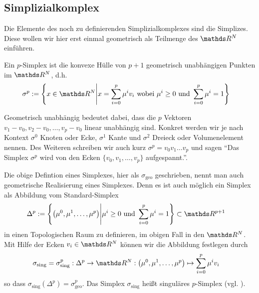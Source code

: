   \subsection{Simplizialkomplex}
    
    Die Elemente des noch zu definierenden Simplizialkomplexes sind die Simplizes.
    Diese wollen wir hier erst einmal geometrisch als Teilmenge des \( \R^{N} \) einführen.

    \begin{definition}
      \label{defSimplex}
      Ein \( p \)-Simplex ist die konvexe Hülle von \( p+1 \) geometrisch unabhängigen Punkten im \( \R^{N} \), d.h.
      \begin{align}
        \sigma^{p} &:= \left\{  x \in \R^{N} \middle| x = \sum_{i=0}^{p}\mu^{i}v_{i} \text{ wobei } \mu^{i} \ge 0  \text{ und } \sum_{i=0}^{p}\mu^{i} = 1 \right\}
      \end{align}
    \end{definition}
    
    Geometrisch unabhängig bedeutet dabei, dass die \( p \) Vektoren \( v_{1} - v_{0}, v_{2} - v_{0},\ldots,  v_{p} - v_{0} \) linear unabhängig sind.
    Konkret werden wir je nach Kontext \( \sigma^{0} \) Knoten oder Ecke, \( \sigma^{1} \) Kante und \( \sigma^{2} \) Dreieck oder Volumenelement nennen.
    Des Weiteren schreiben wir auch kurz \( \sigma^{p} = v_{0} v_{1} \ldots v_{p} \) und sagen 
    "`Das Simplex \( \sigma^{p} \) wird von den Ecken \( \{ v_{0}, v_{1}, \ldots, v_{p}\} \) aufgespannt."'.

    \begin{bemerkung}
      \label{singSimplex}
      Die obige Defintion eines Simplexes, hier als \( \sigma_{\text{geo}} \) geschrieben, nennt man auch geometrische Realisierung eines Simplexes.
      Denn es ist auch möglich ein Simplex als Abbildung vom Standard-Simplex 
        \begin{align} 
          \Delta^{p} &:= \left\{\left( \mu^{0},\mu^{1},\ldots,\mu^{p} \right) \middle| \mu^{i} \ge 0  \text{ und } \sum_{i=0}^{p}\mu^{i} = 1 \right\} \subset
        \R^{p+1} 
        \end{align}
      in einen Topologischen Raum zu definieren, im obigen Fall in den \( \R^{N} \). 
      Mit Hilfe der Ecken \( v_{i}\in\R^{N} \) können wir die Abbildung festlegen durch
      \begin{align}
        \sigma_{\text{sing}} = \sigma^{p}_{\text{sing}} : \Delta^{p} &\rightarrow \R^{N}
                        : \left( \mu^{0},\mu^{1},\ldots,\mu^{p} \right)\mapsto \sum_{i=0}^{p}\mu^{i}v_{i}
      \end{align}
      so dass \( \sigma_{\text{sing}}(\Delta^{p}) = \sigma^{p}_{\text{geo}} \).
      Das Simplex \(\sigma_{\text{sing}}\) heißt singuläres \( p \)-Simplex (vgl. \cite{lueck}).
    \end{bemerkung}


